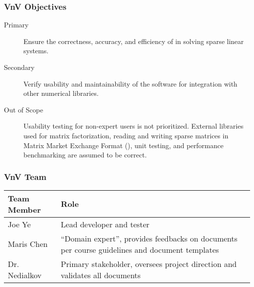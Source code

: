 \documentclass[t,12pt,numbers,fleqn]{beamer}
\begin{document}
\begin{frame}
\frametitle{VnV Objectives}

\begin{description}
\item[Primary] Ensure the correctness, accuracy, and efficiency of \progname{} in
  solving sparse linear systems.
\item[Secondary] Verify usability and maintainability of the software for
  integration with other numerical libraries.
\item[Out of Scope] Usability testing for non-expert users is not prioritized.
  External libraries used for matrix factorization, reading and writing sparse
  matrices in Matrix Market Exchange Format (\cite{noauthor_matrix_2013}), unit
  testing, and performance benchmarking are assumed to be correct.
\end{description}

\end{frame}


\begin{frame}
\frametitle{VnV Team}

\vspace{10pt}
\begin{tabularx}{\linewidth}{lX}
  \toprule
  \textbf{Team Member} & \textbf{Role}                           \\
  \midrule
  Joe Ye         & Lead developer and tester         \\
  Maris Chen     & ``Domain expert'', provides feedbacks on documents per course
                   guidelines and document templates \\
  Dr. Nedialkov  & Primary stakeholder, oversees project direction and validates
                   all documents                     \\
  \bottomrule
\end{tabularx}

\end{frame}

\end{document}

